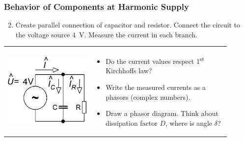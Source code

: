 \documentclass{beamer}
\begin{document}
	\begin{frame}
    \frametitle{Behavior of Components at Harmonic Supply}
		\begin{enumerate}
			\setcounter{enumi}{1}
			\item Create parallel connection of capacitor and resistor. Connect the circuit to the voltage source 4~V. Measure the current in each branch.
		\end{enumerate}
		
		\begin{center}
			\begin{tabular}{m{0.35\linewidth} m{0.55\linewidth}}
			\includegraphics[scale=0.25]{obr03_RCobvod.png} &
			
			\begin{itemize}
				\item Do the current values respect 1\textsuperscript{st} Kirchhoffs law?
				\item Write the measured currents as a phasors (complex numbers).
				\item Draw a phasor diagram. Think about dissipation factor $D$, where is angle $\delta$?
			\end{itemize}
			\end{tabular}
		\end{center}
	\end{frame}
\end{document}
